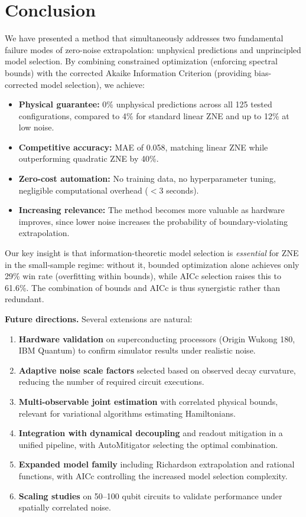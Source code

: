 \section{Conclusion}
\label{sec:conclusion}

We have presented a method that simultaneously addresses two fundamental failure modes of zero-noise extrapolation: unphysical predictions and unprincipled model selection. By combining constrained optimization (enforcing spectral bounds) with the corrected Akaike Information Criterion (providing bias-corrected model selection), we achieve:

\begin{itemize}
    \item \textbf{Physical guarantee:} 0\% unphysical predictions across all 125 tested configurations, compared to 4\% for standard linear ZNE and up to 12\% at low noise.
    \item \textbf{Competitive accuracy:} MAE of 0.058, matching linear ZNE while outperforming quadratic ZNE by 40\%.
    \item \textbf{Zero-cost automation:} No training data, no hyperparameter tuning, negligible computational overhead ($<$3 seconds).
    \item \textbf{Increasing relevance:} The method becomes more valuable as hardware improves, since lower noise increases the probability of boundary-violating extrapolation.
\end{itemize}

Our key insight is that information-theoretic model selection is \emph{essential} for ZNE in the small-sample regime: without it, bounded optimization alone achieves only 29\% win rate (overfitting within bounds), while AICc selection raises this to 61.6\%. The combination of bounds and AICc is thus synergistic rather than redundant.

\textbf{Future directions.} Several extensions are natural:
\begin{enumerate}
    \item \textbf{Hardware validation} on superconducting processors (Origin Wukong 180, IBM Quantum) to confirm simulator results under realistic noise.
    \item \textbf{Adaptive noise scale factors} selected based on observed decay curvature, reducing the number of required circuit executions.
    \item \textbf{Multi-observable joint estimation} with correlated physical bounds, relevant for variational algorithms estimating Hamiltonians.
    \item \textbf{Integration with dynamical decoupling} and readout mitigation in a unified pipeline, with AutoMitigator selecting the optimal combination.
    \item \textbf{Expanded model family} including Richardson extrapolation and rational functions, with AICc controlling the increased model selection complexity.
    \item \textbf{Scaling studies} on 50--100 qubit circuits to validate performance under spatially correlated noise.
\end{enumerate}

